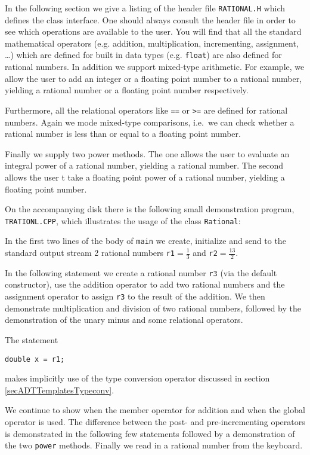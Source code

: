 In the following section we give a listing of the header file \verb+RATIONAL.H+
which defines the class interface. One should always consult the header file
in order to see which operations are available to the user. You will find that
all the standard mathematical operators (e.g. addition, multiplication, incrementing, 
assignment, \dots) which are defined for built in data types (e.g. \verb+float+) 
are also defined for rational numbers. In addition we support mixed-type arithmetic.
For example, we allow
the user to add an integer or a floating point number to a rational number,
yielding a rational number or a floating point number respectively.

Furthermore, all the relational operators like \verb+==+ or \verb+>=+ are defined
for rational numbers. Again we mode mixed-type comparisons, i.e.\ we can check 
whether a rational number is less than or equal to a floating point number.

Finally we supply two power methods. The one allows the user to evaluate
an integral power of a rational number, yielding a rational number. The second
allows the user t take a floating point power of a rational number, yielding a
floating point number.

On the accompanying disk there is the following small demonstration program, 
\verb+TRATIONL.CPP+, which illustrates the
usage of the class \verb+Rational+:



In the first two lines of the body of \verb+main+ we create, initialize and send to
the standard output stream 2 rational numbers \verb+r1+$=\!\! \frac{1}{3}$ and 
\verb+r2+$=\!\! \frac{13}{2}$.

In the following statement we create a rational number \verb+r3+ (via the
default constructor), use the addition operator to add two rational numbers
and the assignment operator to assign \verb+r3+ to the result of the addition.
We then demonstrate multiplication and division of two rational numbers, followed
by the demonstration of the unary minus and some relational operators.

The statement
{\footnotesize\begin{verbatim}
double x = r1;
\end{verbatim}}
makes implicitly use of the type conversion operator discussed in section
\ref{secADTTemplatesTypeconv}.

We continue to show when the member operator for addition and when the global
operator is used. The difference between the post- and pre-incrementing
operators is demonstrated in the following few statements followed by a 
demonstration of the two \verb+power+ methods. Finally we read in a
rational number from the keyboard.

